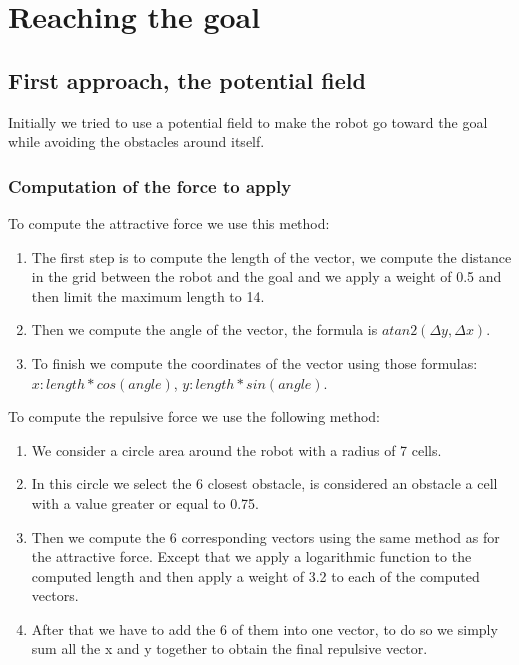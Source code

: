 \section{Reaching the goal}

\subsection{First approach, the potential field}

Initially we tried to use a potential field to make the robot go toward the goal while avoiding the obstacles around itself.

\subsubsection{Computation of the force to apply}

To compute the attractive force we use this method:

\begin{enumerate}
    \item The first step is to compute the length of the vector, we compute the distance in the grid between the robot and the goal and we apply a weight of 0.5 and then limit the maximum length to 14.
    \item Then we compute the angle of the vector, the formula is $atan2(\Delta y, \Delta x)$.
    \item To finish we compute the coordinates of the vector using those formulas: $x: length * cos(angle)$, $y: length * sin(angle)$.
\end{enumerate}

To compute the repulsive force we use the following method:

\begin{enumerate}
    \item We consider a circle area around the robot with a radius of 7 cells.
    \item In this circle we select the 6 closest obstacle, is considered an obstacle a cell with a value greater or equal to 0.75.
    \item Then we compute the 6 corresponding vectors using the same method as for the attractive force. Except that we apply a logarithmic function to the computed length and then apply a weight of 3.2 to each of the computed vectors.
    \item After that we have to add the 6 of them into one vector, to do so we simply sum all the x and y together to obtain the final repulsive vector.
\end{enumerate}

